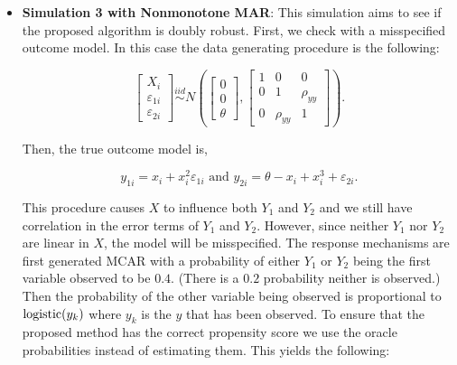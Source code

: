 \begin{itemize}
    
    
    

    \newpage

  \item \textbf{Simulation 3 with Nonmonotone MAR}:
    This simulation aims to see if the proposed algorithm is doubly robust.
    First, we check with a misspecified outcome model. In this case the data
    generating procedure is the following:

    \[\begin{bmatrix}
    X_i \\ \varepsilon_{1i} \\ \varepsilon_{2i}
    \end{bmatrix} \stackrel{iid}{\sim}
    N\left(
    \begin{bmatrix}
        0 \\ 0 \\ \theta
    \end{bmatrix},
    \begin{bmatrix}
        1 & 0 & 0 \\
        0 & 1 & \rho_{yy}\\
        0 & \rho_{yy} & 1
    \end{bmatrix}
    \right).\]

    Then, the true outcome model is,

    \[y_{1i} = x_i + x_i^2 \varepsilon_{1i} \text{ and } 
    y_{2i} = \theta -x_i + x_i^3 + \varepsilon_{2i}.\]

    This procedure causes $X$ to influence both $Y_1$ and $Y_2$ and we still
    have correlation in the error terms of $Y_1$ and $Y_2$. However, since
    neither $Y_1$ nor $Y_2$ are linear in $X$, the model will be misspecified.
    The response mechanisms are first generated MCAR with a probability of
    either $Y_1$ or $Y_2$ being the first variable observed to be $0.4$. (There
    is a $0.2$ probability neither is observed.) Then the probability of the
    other variable being observed is proportional to ${\text{logistic}}(y_k)$ where
    $y_k$ is the $y$ that has been observed. To ensure that the proposed method
    has the correct propensity score we use the oracle probabilities instead of
    estimating them. This yields the following:

    
    
    

    \newpage


\end{itemize}

